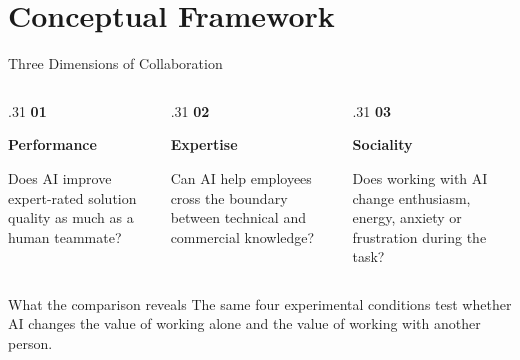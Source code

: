 \section{Conceptual Framework}
\begin{frame}[t]{Three Dimensions of Collaboration}
\small
\vspace{0.22cm}
\begin{columns}[T,onlytextwidth]
\begin{column}{.31\textwidth}
{\Large\textcolor{paperred}{\bfseries 01}}\par\medskip
{\bfseries Performance}\par\smallskip
Does AI improve expert-rated solution quality as much as a human teammate?
\end{column}
\begin{column}{.31\textwidth}
{\Large\textcolor{paperred}{\bfseries 02}}\par\medskip
{\bfseries Expertise}\par\smallskip
Can AI help employees cross the boundary between technical and commercial knowledge?
\end{column}
\begin{column}{.31\textwidth}
{\Large\textcolor{paperred}{\bfseries 03}}\par\medskip
{\bfseries Sociality}\par\smallskip
Does working with AI change enthusiasm, energy, anxiety or frustration during the task?
\end{column}
\end{columns}

\vspace{0.85cm}
\begin{block}{What the comparison reveals}
The same four experimental conditions test whether AI changes the value of working alone and the value of working with another person.
\end{block}
\end{frame}
